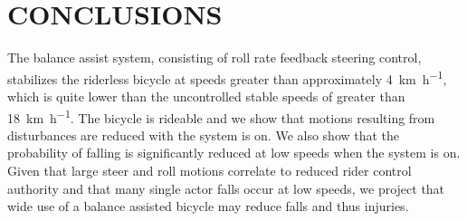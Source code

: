 \documentclass{icsc}
\def\kph{\kilo\meter\per\hour}
\begin{document}
\begin{figure}
  \begin{center}
    \label{fig:fig2}
  \end{center}
\end{figure}

\thispagestyle{empty}

\section{CONCLUSIONS}
%
The balance assist system, consisting of roll rate feedback steering control,
stabilizes the riderless bicycle at speeds greater than approximately
4~\si{\kph}, which is quite lower than the uncontrolled stable speeds of
greater than 18~\si{\kph}. The bicycle is rideable and we show that motions
resulting from disturbances are reduced with the system is on. We also show
that the probability of falling is significantly reduced at low speeds when the
system is on. Given that large steer and roll motions correlate to reduced
rider control authority and that many single actor falls occur at low speeds,
we project that wide use of a balance assisted bicycle may reduce falls and
thus injuries.
\end{document}
